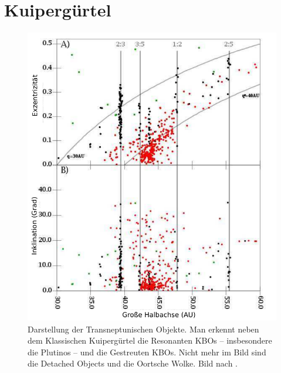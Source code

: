 \documentclass[12pt,a4paper,twoside,open=right,bibliography=totoc]{scrbook}
\renewcommand{\cite}{ \citep}
\begin{document}
\section{Kuipergürtel}\label{Kuiper}
\begin{figure}
\centering 
\includegraphics[scale=0.7]{img/LEVISON2008-1-mod}
\caption{Darstellung der Transneptunischen Objekte. Man erkennt neben dem Klassischen Kuipergürtel die Resonanten KBOs -- insbesondere die Plutinos -- und die Gestreuten KBOs. Nicht mehr im Bild sind die Detached Objects und die Oortsche Wolke. Bild nach \cite{Levison2008}.}
\label{fig:KBOs}
\end{figure}
\end{document}
